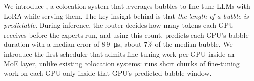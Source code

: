 We introduce \sys, a colocation system that leverages bubbles to fine-tune \acp{LLM} with \ac{LoRA} while serving them.
The key insight behind \sys is that \emph{the length of a bubble is predictable}.
During inference, the router decides how many tokens each GPU receives before the experts run, and using this count, \sys predicts each GPU's bubble duration with a median error of \SI{8.9}{\micro\second}, about 7\% of the median bubble.
We introduce the first scheduler that admits fine-tuning work per GPU inside an \ac{MoE} layer, unlike existing colocation systems: \sys runs short chunks of fine-tuning work on each GPU only inside that GPU's predicted bubble window.


